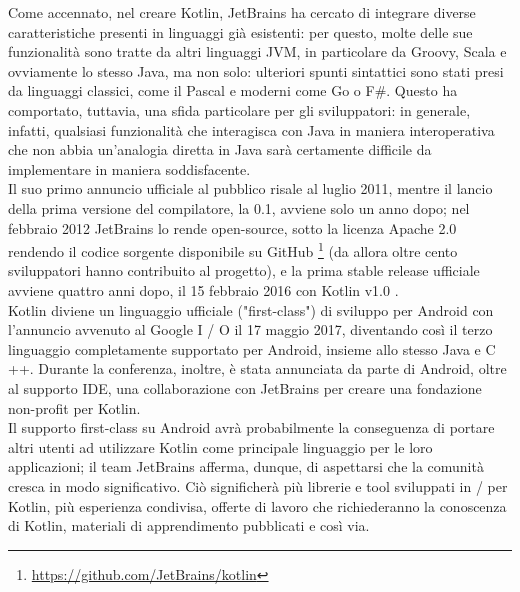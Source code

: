 Come accennato, nel creare Kotlin, JetBrains ha cercato di integrare diverse caratteristiche presenti in linguaggi già esistenti: per questo, molte delle sue funzionalità sono tratte da altri linguaggi JVM, in particolare da Groovy, Scala e ovviamente lo stesso Java, ma non solo: ulteriori spunti sintattici sono stati presi da linguaggi classici, come il Pascal e moderni come Go o F\#. Questo ha comportato, tuttavia, una sfida particolare per gli sviluppatori: in generale, infatti, qualsiasi funzionalità che interagisca con Java in maniera interoperativa che non abbia un'analogia diretta in Java sarà certamente difficile da implementare in maniera soddisfacente.\\

Il suo primo annuncio ufficiale al pubblico risale al luglio 2011, mentre il lancio della prima versione del compilatore, la 0.1, avviene solo un anno dopo; nel febbraio 2012 JetBrains lo rende open-source, sotto la licenza Apache 2.0 rendendo il codice sorgente disponibile su GitHub \footnote{\url{https://github.com/JetBrains/kotlin}} (da allora oltre cento sviluppatori hanno contribuito al progetto), e la prima stable release ufficiale avviene quattro anni dopo, il 15 febbraio 2016 con Kotlin v1.0 \cite{kotlinv1.0}.\\

Kotlin diviene un linguaggio ufficiale ("first-class") di sviluppo per Android con l'annuncio \cite{kotlinOfficialAndroid} avvenuto al Google I / O \cite{googleio} il 17 maggio 2017, diventando così il terzo linguaggio completamente supportato per Android, insieme allo stesso Java e C ++. Durante la conferenza, inoltre, è stata annunciata da parte di Android, oltre al supporto IDE, una collaborazione con JetBrains per creare una fondazione non-profit per Kotlin. \\
Il supporto first-class su Android avrà probabilmente la conseguenza di portare altri utenti ad utilizzare Kotlin come principale linguaggio per le loro applicazioni; il team JetBrains afferma, dunque, di aspettarsi che la comunità cresca in modo significativo. Ciò significherà più librerie e tool sviluppati in / per Kotlin, più esperienza condivisa, offerte di lavoro che richiederanno la conoscenza di Kotlin, materiali di apprendimento pubblicati e così via.\\

